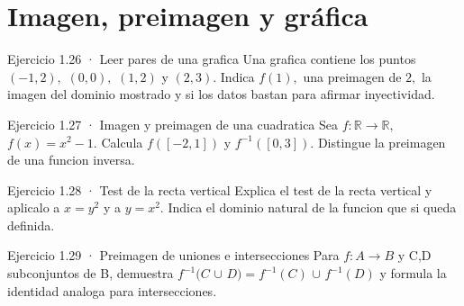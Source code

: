 \documentclass[10pt,a4paper,oneside,openany]{book}
\begin{document}
\section{Imagen, preimagen y gráfica}
\begin{PSevenExerciseFixed}{Ejercicio 1.26 · Leer pares de una grafica}
Una grafica contiene los puntos \((-1,2),\) \((0,0),\) \((1,2)\) y \((2,3)\). Indica \(f(1),\) una preimagen de \(2,\) la imagen del dominio mostrado y si los datos bastan para afirmar inyectividad.
\end{PSevenExerciseFixed}
\begin{PSevenExerciseFixed}{Ejercicio 1.27 · Imagen y preimagen de una cuadratica}
Sea \(f:\mathbb{R}\to \mathbb{R},\) \(f(x)=x^{2}-1\). Calcula \(f([-2,1])\) y \(f^{-1}([0,3])\). Distingue la preimagen de una funcion inversa.
\end{PSevenExerciseFixed}
\begin{PSevenExerciseFixed}{Ejercicio 1.28 · Test de la recta vertical}
Explica el test de la recta vertical y aplicalo a \(x=y^{2}\) y a \(y=x^{2}\). Indica el dominio natural de la funcion que si queda definida.
\end{PSevenExerciseFixed}
\begin{PSevenExerciseFixed}{Ejercicio 1.29 · Preimagen de uniones e intersecciones}
Para \(f:A\to B\) y C,D subconjuntos de B, demuestra \(f^{-1}(C\) \(\cup \) \(D)=f^{-1}(C)\) \(\cup \) \(f^{-1}(D)\) y formula la identidad analoga para intersecciones.
\end{PSevenExerciseFixed}
\end{document}
